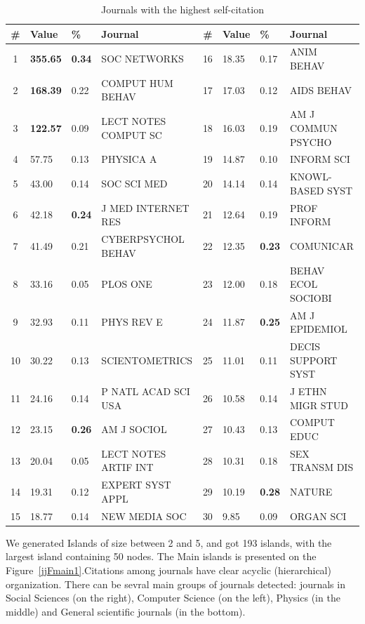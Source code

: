 \documentclass[11pt]{article} %
\begin{document}
\begin{table}
\caption{Journals with the highest self-citation} \label{jselfcite}\medskip
\renewcommand{\arraystretch}{0.95}
\small
\begin{center}
\begin{tabular}{c|l|l|l|c|l|l|l|} 
\# &	Value& \% &	Journal &  \# &	Value& \% & Journal \\ \hline 
1 &	\textbf{355.65}&	\textbf{0.34}&	SOC NETWORKS&	16&	       18.35 &    0.17	  &     ANIM BEHAV\\
2 &	\textbf{168.39}&	0.22&	COMPUT HUM BEHAV&	17&    17.03 & 	  0.12	  &     AIDS BEHAV\\
3 &	\textbf{122.57}&	0.09&	LECT NOTES COMPUT SC&	18&    16.03 & 	  0.19	  &     AM J COMMUN PSYCHO \\
4 &	57.75&	0.13&	PHYSICA A&	19&	       14.87 &	  0.10	  &     INFORM SCI\\
5 &	43.00&	0.14&	SOC SCI MED&	20&	       14.14 &	  0.14	  &     KNOWL-BASED SYST\\
6 &	42.18&	\textbf{0.24}&	J MED INTERNET RES&	21&    12.64 &	  0.19	  &     PROF INFORM\\
7 &	41.49&	0.21&	CYBERPSYCHOL BEHAV&	22&    12.35 & 	 \textbf{0.23}	  &     COMUNICAR\\
8 &	33.16&	0.05&	PLOS ONE&	23&	       12.00 & 	  0.18	  &     BEHAV ECOL SOCIOBI \\
9 &	32.93&	0.11&	PHYS REV E&	24&	       11.87 & 	  \textbf{0.25}	  &     AM J EPIDEMIOL\\
10 &	30.22&	0.13&	SCIENTOMETRICS&	25&	       11.01 & 	  0.11	  &     DECIS SUPPORT SYST \\
11 &	24.16&	0.14&	P NATL ACAD SCI USA&	26&    10.58 & 	  0.14	  &     J ETHN MIGR STUD\\
12 &	23.15&	\textbf{0.26}&	AM J SOCIOL&	27&	       10.43 & 	  0.13	  &     COMPUT EDUC\\
13 &	20.04&	0.05&	LECT NOTES ARTIF INT&	28&    10.31 & 	  0.18	  &     SEX TRANSM DIS\\
14 &	19.31&	0.12&	EXPERT SYST APPL&	29&    10.19 & 	 \textbf{0.28}	  &     NATURE\\
15 &	18.77&	0.14&	NEW MEDIA SOC&	30&	       9.85 & 	  0.09	  &     ORGAN SCI\\ \hline 
\end{tabular} 
\end{center}
\end{table}  

We generated Islands of size between 2 and 5, and got 193 islands, with the largest island containing 50 nodes. The Main islands is presented on the Figure~\ref{jjFmain1}.Citations among journals have clear acyclic (hierarchical) organization. There can be sevral main groups of journals detected: journals in Social Sciences (on the right), Computer Science (on the left), Physics (in the middle) and General scientific journals (in the bottom).  \medskip 
\end{document}
